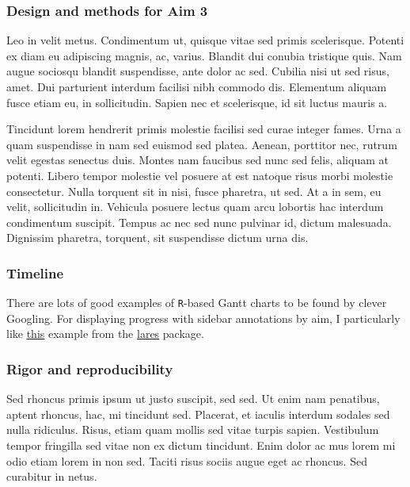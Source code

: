 \documentclass[
  11pt,
  letterpaper,
  DIV=11,
  numbers=noendperiod]{scrartcl}
\begin{document}
\hypertarget{design-and-methods-for-aim-3}{%
\subsubsection{Design and methods for Aim
3}\label{design-and-methods-for-aim-3}}

Leo in velit metus. Condimentum ut, quisque vitae sed primis
scelerisque. Potenti ex diam eu adipiscing magnis, ac, varius. Blandit
dui conubia tristique quis. Nam augue sociosqu blandit suspendisse, ante
dolor ac sed. Cubilia nisi ut sed risus, amet. Dui parturient interdum
facilisi nibh commodo dis. Elementum aliquam fusce etiam eu, in
sollicitudin. Sapien nec et scelerisque, id sit luctus mauris a.

Tincidunt lorem hendrerit primis molestie facilisi sed curae integer
fames. Urna a quam suspendisse in nam sed euismod sed platea. Aenean,
porttitor nec, rutrum velit egestas senectus duis. Montes nam faucibus
sed nunc sed felis, aliquam at potenti. Libero tempor molestie vel
posuere at est natoque risus morbi molestie consectetur. Nulla torquent
sit in nisi, fusce pharetra, ut sed. At a in sem, eu velit, sollicitudin
in. Vehicula posuere lectus quam arcu lobortis hac interdum condimentum
suscipit. Tempus ac nec sed nunc pulvinar id, dictum malesuada.
Dignissim pharetra, torquent, sit suspendisse dictum urna dis.

\hypertarget{timeline}{%
\subsubsection{Timeline}\label{timeline}}

There are lots of good examples of \texttt{R}-based Gantt charts to be
found by clever Googling. For displaying progress with sidebar
annotations by aim, I particularly like
\href{https://datascienceplus.com/visualize-your-cvs-timeline-with-r-gantt-style/}{\underline{this}}
example from the
\href{https://github.com/laresbernardo/lares}{\underline{lares}}
package.

\hypertarget{rigor-and-reproducibility}{%
\subsubsection{Rigor and
reproducibility}\label{rigor-and-reproducibility}}

Sed rhoncus primis ipsum ut justo suscipit, sed sed. Ut enim nam
penatibus, aptent rhoncus, hac, mi tincidunt sed. Placerat, et iaculis
interdum sodales sed nulla ridiculus. Risus, etiam quam mollis sed vitae
turpis sapien. Vestibulum tempor fringilla sed vitae non ex dictum
tincidunt. Enim dolor ac mus lorem mi odio etiam lorem in non sed.
Taciti risus sociis augue eget ac rhoncus. Sed curabitur in netus.
\end{document}

